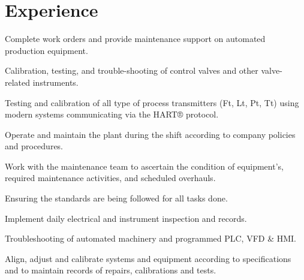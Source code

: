 \documentclass[]{deedy-resume-openfont}
\begin{document}
\hfill
\begin{minipage}[t]{0.66\textwidth} 


\section{Experience}
\sectionsep

\vspace{\topsep} %
\begin{tightemize}
\item Complete work orders and provide maintenance support on automated production equipment.
\item Calibration, testing, and trouble-shooting of control valves and other valve-related instruments.
\item Testing and calibration of all type of process transmitters (Ft, Lt, Pt, Tt) using modern systems communicating via the HART® protocol.
\end{tightemize}
\sectionsep

\begin{tightemize}
\item Operate and maintain the plant during the shift according to company policies and procedures.
\item Work with the maintenance team to ascertain the condition of equipment's, required maintenance activities, and scheduled overhauls.
\item Ensuring the standards are being followed for all tasks done.
\end{tightemize}
\sectionsep

\begin{tightemize}
\item Implement daily electrical and instrument inspection and records.
\item Troubleshooting of automated machinery and programmed PLC, VFD \& HMI.
\item Align, adjust and calibrate systems and equipment according to specifications and to maintain records of repairs, calibrations and tests.
\end{tightemize}
\sectionsep


\end{minipage}
\end{document}
